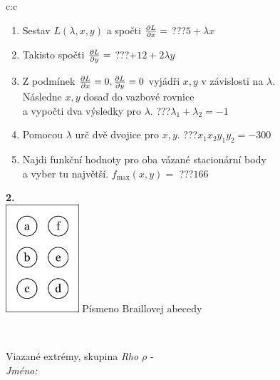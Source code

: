 \documentclass[10pt]{report}
\begin{document}
\begin{tabular}{c:c}
\begin{minipage}[c][104.5mm][t]{0.5\linewidth}
\begin{center}
\begin{minipage}{0.79\linewidth}
\begin{center}
\begin{varwidth}{\linewidth}
\begin{enumerate}
\item Sestav $L(\lambda,x,y)$ a spočti $\pdv{L}{x}=$\quad \dotfill\; ???\;\dotfill \quad $5+\lambda x$
\item Takisto spočti $\pdv{L}{y}=$\quad \dotfill\; ???\;\dotfill \quad $+12+2\lambda y$
\item Z podmínek $\pdv{L}{x}=0 , \pdv{L}{y}=0$ vyjádři $x,y$ v závislosti na $\lambda$.\\ \phantom{xxxxxx}Následne $x,y$ dosaď do vazbové rovnice\\ \phantom{xxxxxx}a vypočti dva výsledky pro $\lambda$.\quad \dotfill\; ???\;\dotfill \quad $\lambda_1+\lambda_2=-1$
\item Pomocou $\lambda$ urč dvě dvojice pro $x,y$.\quad \dotfill\; ???\;\dotfill \quad $x_1 x_2 y_1 y_2=-300$
\item Najdi funkční hodnoty pro oba vázané stacionární body\\ \phantom{xxxxxx}a vyber tu najvětší. $f_{\text{max}}(x,y)=$\quad \dotfill\; ???\;\dotfill \quad $166$
\end{enumerate}
\end{varwidth}
\end{center}
\end{minipage}
\begin{minipage}{0.20\linewidth}
\begin{center}
{\Huge\bfseries 2.} \\[2mm]
\includegraphics[height=40mm]{../images/braille.png}
{\small Písmeno Braillovej abecedy}
\end{center}
\end{minipage}
\end{center}
\end{minipage}
\\ \hdashline
\begin{minipage}[c][104.5mm][t]{0.5\linewidth}
\begin{center}
\vspace{7mm}
{\huge Viazané extrémy, skupina \textit{Rho $\rho$} -}\\[5mm]
\textit{Jméno:}\phantom{xxxxxxxxxxxxxxxxxxxxxxxxxxxxxxxxxxxxxxxxxxxxxxxxxxxxxxxxxxxxxxxxx}\\[5mm]

\end{center}
\end{minipage}
\end{tabular}
\end{document}
